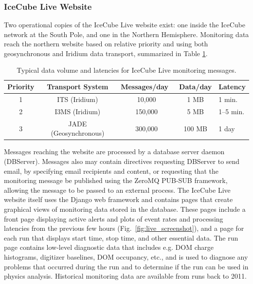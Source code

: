\subsubsection{IceCube Live Website}

Two operational copies of the IceCube Live website exist: one inside the
IceCube network at the South Pole, and one in the Northern Hemisphere.
Monitoring data reach the northern website based on relative priority and using
both geosynchronous and Iridium data transport, summarized in Table
\ref{i3messages}.

\begin{table}[!ht]
  \centering
  \caption{Typical data volume and latencies for IceCube Live monitoring
    messages.} 
  \label{i3messages}  
  \begin{tabularx}{0.85\textwidth}{|c|c|c|c|X|}
    \hline Priority & Transport System & Messages/day~ & Data/day & Latency\\
    \hline 1 & ITS (Iridium) & 10,000 & 1 MB & 1 min. \\
    \hline 2 & I3MS (Iridium) & 150,000 & 5 MB & 1--5 min. \\
    \hline 3 & JADE (Geosynchronous) & 300,000 & 100 MB & 1 day \\
    \hline
  \end{tabularx}
\end{table}

Messages reaching the website are processed by a database server daemon
(DBServer).  Messages also may contain directives requesting DBServer to send email, by
specifying email recipients and content, or requesting that the monitoring
message be published using the ZeroMQ PUB-SUB framework, allowing the message to be
passed to an external process.  The IceCube Live website itself uses the
Django web framework and contains pages that create graphical views of
monitoring data stored in the database.  These pages include a front page
displaying active alerts and plots of event rates and processing latencies
from the previous few hours (Fig.~\ref{fig:live_screenshot}), and a page
for each run that displays start  
time, stop time, and other essential data.  The run page contains low-level
diagnostic data that includes e.g. DOM charge histograms, digitizer baselines,
DOM occupancy, etc., and is used to diagnose any problems that occurred
during the run and to determine if the run can be used in physics
analysis.  Historical monitoring data are available from runs back to
2011.  

